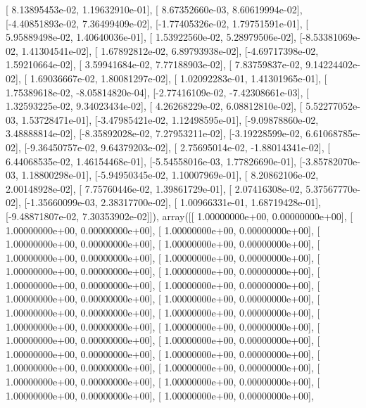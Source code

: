 \documentclass{article}
\begin{document}
       [ 8.13895453e-02,  1.19632910e-01],
       [ 8.67352660e-03,  8.60619994e-02],
       [-4.40851893e-02,  7.36499409e-02],
       [-1.77405326e-02,  1.79751591e-01],
       [ 5.95889498e-02,  1.40640036e-01],
       [ 1.53922560e-02,  5.28979506e-02],
       [-8.53381069e-02,  1.41304541e-02],
       [ 1.67892812e-02,  6.89793938e-02],
       [-4.69717398e-02,  1.59210664e-02],
       [ 3.59941684e-02,  7.77188903e-02],
       [ 7.83759837e-02,  9.14224402e-02],
       [ 1.69036667e-02,  1.80081297e-02],
       [ 1.02092283e-01,  1.41301965e-01],
       [ 1.75389618e-02, -8.05814820e-04],
       [-2.77416109e-02, -7.42308661e-03],
       [ 1.32593225e-02,  9.34023434e-02],
       [ 4.26268229e-02,  6.08812810e-02],
       [ 5.52277052e-03,  1.53728471e-01],
       [-3.47985421e-02,  1.12498595e-01],
       [-9.09878860e-02,  3.48888814e-02],
       [-8.35892028e-02,  7.27953211e-02],
       [-3.19228599e-02,  6.61068785e-02],
       [-9.36450757e-02,  9.64379203e-02],
       [ 2.75695014e-02, -1.88014341e-02],
       [ 6.44068535e-02,  1.46154468e-01],
       [-5.54558016e-03,  1.77826690e-01],
       [-3.85782070e-03,  1.18800298e-01],
       [-5.94950345e-02,  1.10007969e-01],
       [ 8.20862106e-02,  2.00148928e-02],
       [ 7.75760446e-02,  1.39861729e-01],
       [ 2.07416308e-02,  5.37567770e-02],
       [-1.35660099e-03,  2.38317700e-02],
       [ 1.00966331e-01,  1.68719428e-01],
       [-9.48871807e-02,  7.30353902e-02]]), array([[ 1.00000000e+00,  0.00000000e+00],
       [ 1.00000000e+00,  0.00000000e+00],
       [ 1.00000000e+00,  0.00000000e+00],
       [ 1.00000000e+00,  0.00000000e+00],
       [ 1.00000000e+00,  0.00000000e+00],
       [ 1.00000000e+00,  0.00000000e+00],
       [ 1.00000000e+00,  0.00000000e+00],
       [ 1.00000000e+00,  0.00000000e+00],
       [ 1.00000000e+00,  0.00000000e+00],
       [ 1.00000000e+00,  0.00000000e+00],
       [ 1.00000000e+00,  0.00000000e+00],
       [ 1.00000000e+00,  0.00000000e+00],
       [ 1.00000000e+00,  0.00000000e+00],
       [ 1.00000000e+00,  0.00000000e+00],
       [ 1.00000000e+00,  0.00000000e+00],
       [ 1.00000000e+00,  0.00000000e+00],
       [ 1.00000000e+00,  0.00000000e+00],
       [ 1.00000000e+00,  0.00000000e+00],
       [ 1.00000000e+00,  0.00000000e+00],
       [ 1.00000000e+00,  0.00000000e+00],
       [ 1.00000000e+00,  0.00000000e+00],
       [ 1.00000000e+00,  0.00000000e+00],
       [ 1.00000000e+00,  0.00000000e+00],
       [ 1.00000000e+00,  0.00000000e+00],
       [ 1.00000000e+00,  0.00000000e+00],
       [ 1.00000000e+00,  0.00000000e+00],
       [ 1.00000000e+00,  0.00000000e+00],
\end{document}
